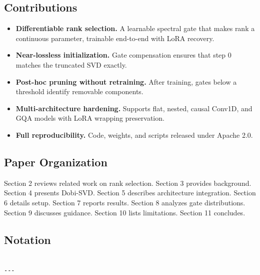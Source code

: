 \subsection{Contributions}

\begin{itemize}
\item \textbf{Differentiable rank selection.} A learnable spectral gate that makes
  rank a continuous parameter, trainable end-to-end with LoRA recovery.
\item \textbf{Near-lossless initialization.} Gate compensation ensures that step 0
  matches the truncated SVD exactly.
\item \textbf{Post-hoc pruning without retraining.} After training, gates below a
  threshold identify removable components.
\item \textbf{Multi-architecture hardening.} Supports flat, nested, causal Conv1D,
  and GQA models with LoRA wrapping preservation.
\item \textbf{Full reproducibility.} Code, weights, and scripts released under
  Apache 2.0.

\end{itemize}
\subsection{Paper Organization}

Section 2 reviews related work on rank selection. Section 3 provides 
background. Section 4 presents Dobi-SVD. Section 5 describes architecture 
integration. Section 6 details setup. Section 7 reports results. Section 8 
analyzes gate distributions. Section 9 discusses guidance. Section 10 lists 
limitations. Section 11 concludes.



\subsection{Notation}

\begin{lstlisting}

---
\end{lstlisting}